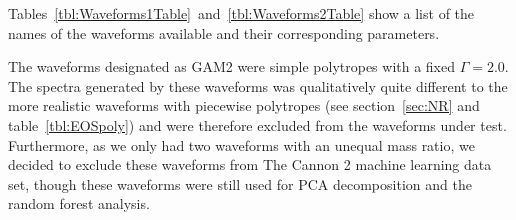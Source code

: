 Tables~\ref{tbl:Waveforms1Table}~and~\ref{tbl:Waveforms2Table} show a list of the names of the waveforms available and their corresponding parameters. 

The waveforms designated as GAM2 were simple polytropes with a fixed $\Gamma=2.0$. The spectra generated by these waveforms was qualitatively quite different to the more realistic waveforms with piecewise polytropes (see section~\ref{sec:NR} and table~\ref{tbl:EOSpoly}) and were therefore excluded from the waveforms under test. Furthermore, as we only had two waveforms with an unequal mass ratio, we decided to exclude these waveforms from The Cannon 2 machine learning data set, though these waveforms were still used for PCA decomposition and the random forest analysis.
